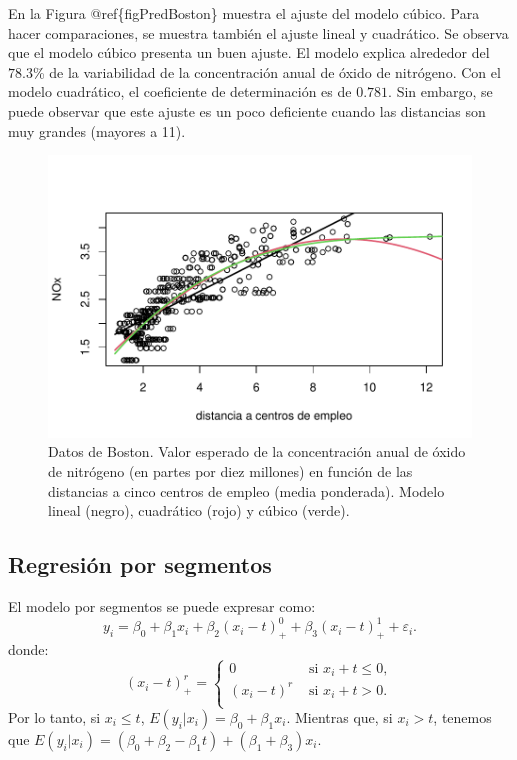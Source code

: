 \documentclass[
]{article}
\begin{document}
En la Figura @ref\{figPredBoston\} muestra el ajuste del modelo cúbico. Para hacer comparaciones, se muestra también el ajuste lineal y cuadrático. Se observa que el modelo cúbico presenta un buen ajuste. El modelo explica alrededor del \(78.3\)\% de la variabilidad de la concentración anual de óxido de nitrógeno. Con el modelo cuadrático, el coeficiente de determinación es de \(0.781\). Sin embargo, se puede observar que este ajuste es un poco deficiente cuando las distancias son muy grandes (mayores a 11).

\begin{figure}

{\centering \includegraphics{MLG2_files/figure-latex/figPredBoston-1} 

}

\caption{Datos de Boston. Valor esperado de la concentración anual de óxido de nitrógeno (en partes por diez millones) en función de las distancias a cinco centros de empleo (media ponderada). Modelo lineal (negro), cuadrático (rojo) y cúbico (verde).}\label{fig:figPredBoston}
\end{figure}

\hypertarget{regresiuxf3n-por-segmentos}{%
\subsection{Regresión por segmentos}\label{regresiuxf3n-por-segmentos}}

El modelo por segmentos se puede expresar como:
\[
y_{i} = \beta_{0} + \beta_{1}x_{i} + \beta_{2}(x_{i}-t)^{0}_{+} +  \beta_{3}(x_{i}-t)^{1}_{+} + \varepsilon_{i}.
\]
donde:
\[
(x_{i}-t)_{+}^{r}  = \begin{cases}
0 & \mbox{ si } x_{i} + t \leq 0, \\
(x_{i}-t)^{r} & \mbox{ si } x_{i} + t > 0. \\
\end{cases}
\nonumber
\]
Por lo tanto, si \(x_{i} \leq t\), \(E(y_{i}| x_{i}) = \beta_{0} + \beta_{1}x_{i}\). Mientras que, si \(x_{i} > t\), tenemos que \(E(y_{i}| x_{i}) = (\beta_{0} + \beta_{2} - \beta_{1}t) + (\beta_{1} + \beta_{3})x_{i}\).
\end{document}
